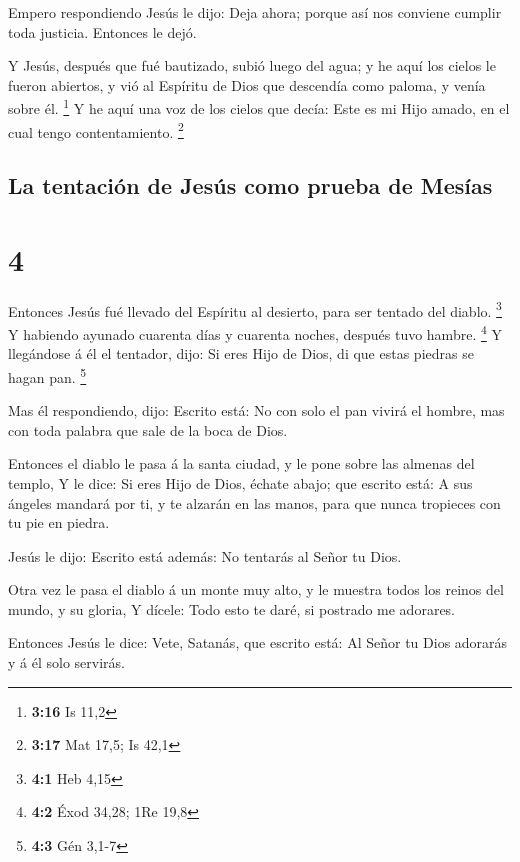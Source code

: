  Empero respondiendo Jesús le dijo: Deja ahora; porque así
nos conviene cumplir toda justicia. Entonces le dejó.

 Y Jesús, después que fué bautizado, subió luego del agua;
y he aquí los cielos le fueron abiertos, y vió al Espíritu de Dios que
descendía como paloma, y venía sobre él. \footnote{\textbf{3:16} Is 11,2}
 Y he aquí una voz de los cielos que decía: Este es mi Hijo
amado, en el cual tengo contentamiento. \footnote{\textbf{3:17} Mat
  17,5; Is 42,1}

\hypertarget{la-tentaciuxf3n-de-jesuxfas-como-prueba-de-mesuxedas}{%
\subsection{La tentación de Jesús como prueba de
Mesías}\label{la-tentaciuxf3n-de-jesuxfas-como-prueba-de-mesuxedas}}

\hypertarget{section-3}{%
\section{4}\label{section-3}}

 Entonces Jesús fué llevado del Espíritu al desierto, para
ser tentado del diablo. \footnote{\textbf{4:1} Heb 4,15}  Y
habiendo ayunado cuarenta días y cuarenta noches, después tuvo hambre.
\footnote{\textbf{4:2} Éxod 34,28; 1Re 19,8}  Y llegándose á
él el tentador, dijo: Si eres Hijo de Dios, di que estas piedras se
hagan pan. \footnote{\textbf{4:3} Gén 3,1-7}

 Mas él respondiendo, dijo: Escrito está: No con solo el pan
vivirá el hombre, mas con toda palabra que sale de la boca de Dios.

 Entonces el diablo le pasa á la santa ciudad, y le pone
sobre las almenas del templo,  Y le dice: Si eres Hijo de
Dios, échate abajo; que escrito está: A sus ángeles mandará por ti, y te
alzarán en las manos, para que nunca tropieces con tu pie en piedra.

 Jesús le dijo: Escrito está además: No tentarás al Señor tu
Dios.

 Otra vez le pasa el diablo á un monte muy alto, y le
muestra todos los reinos del mundo, y su gloria,  Y dícele:
Todo esto te daré, si postrado me adorares.

 Entonces Jesús le dice: Vete, Satanás, que escrito está:
Al Señor tu Dios adorarás y á él solo servirás.

